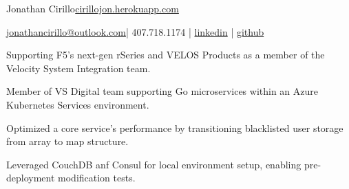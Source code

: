 \documentclass[]{deedy-resume-openfont}
\begin{document}
%
%


\namesection \LARGE {{Jonathan} {Cirillo}}{\href{https://cirillojon.herokuapp.com/}{cirillojon.herokuapp.com}}

\vspace{18pt}

\newcommand{\linkedin}[1]{\faLinkedin\hspace{0.5em}\href{https://linkedin.com/in/#1}{\texttt{#1}}}
\newcommand{\github}[1]{\faGithub\hspace{0.5em}\href{https://github.com/#1}{\texttt{#1}}}

{\FA \faEnvelope} {\href{mailto:jonathancirillo@outlook.com}{jonathancirillo@outlook.com}}\hspace{5pt}|\hspace{5pt}{\FA \faPhone} 407.718.1174 |\hspace{5pt} {\FA \faLinkedin} {\href{https://linkedin.com/in/jonathan-cirillo/}{linkedin}} \hspace{5pt}|\hspace{5pt} {\FA \faGithub} {\href{https://github.com/cirillojon}{github}}


\vspace{6pt}



\begin{tightemize}
\item Supporting F5's next-gen rSeries and VELOS Products as a member of the Velocity System Integration team.
\end{tightemize}
\sectionsep


\begin{tightemize}
\item Member of VS Digital team supporting Go microservices within an Azure Kubernetes Services environment.
\item Optimized a core service's performance by transitioning blacklisted user storage from array to map structure.
\item Leveraged CouchDB anf Consul for local environment setup, enabling pre-deployment modification tests.
\end{tightemize}
\sectionsep
\end{document}
